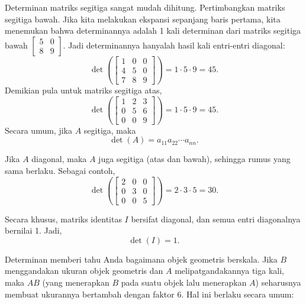 Determinan matriks segitiga sangat mudah dihitung.
Pertimbangkan matriks segitiga bawah. Jika kita melakukan ekspansi sepanjang
baris pertama, kita menemukan bahwa determinannya adalah 1 kali determinan
dari matriks segitiga bawah $\left[ \begin{smallmatrix} 5 & 0 \\ 8 & 9
\end{smallmatrix} \right]$. Jadi determinannya hanyalah
hasil kali entri-entri diagonal:
\begin{equation*}
\det \left(
\begin{bmatrix}
1 & 0 & 0 \\
4 & 5 & 0 \\
7 & 8 & 9
\end{bmatrix}
\right)
=
1 \cdot 5 \cdot 9 = 45 .
\end{equation*}
Demikian pula untuk matriks segitiga atas,
\begin{equation*}
\det \left(
\begin{bmatrix}
1 & 2 & 3 \\
0 & 5 & 6 \\
0 & 0 & 9
\end{bmatrix}
\right)
=
1 \cdot 5 \cdot 9 = 45 .
\end{equation*}
Secara umum, jika $A$ segitiga, maka
\begin{equation*}
\det (A) = a_{11} a_{22} \cdots a_{nn} .
\end{equation*}

Jika $A$ diagonal, maka $A$ juga segitiga (atas dan bawah), sehingga
rumus yang sama berlaku. Sebagai contoh,
\begin{equation*}
\det \left(
\begin{bmatrix}
2 & 0 & 0 \\
0 & 3 & 0 \\
0 & 0 & 5
\end{bmatrix}
\right)
=
2 \cdot 3 \cdot 5 = 30 .
\end{equation*}

Secara khusus, matriks identitas $I$ bersifat diagonal, dan semua entri diagonalnya
bernilai 1. Jadi,
\begin{equation*}
\det(I) = 1 .
\end{equation*}

\medskip

Determinan memberi tahu Anda bagaimana objek geometris berskala.
Jika $B$ menggandakan ukuran objek geometris dan $A$ melipatgandakannya tiga kali,
maka $AB$ (yang menerapkan $B$ pada suatu objek lalu menerapkan $A$) seharusnya membuat ukurannya
bertambah dengan faktor $6$. Hal ini berlaku secara umum:

